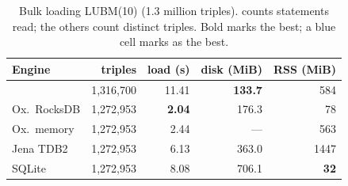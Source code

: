 \begin{table}[t]
\caption{Bulk loading LUBM(10) (1.3 million triples). \sys{} counts statements read; the others count distinct triples. Bold marks the best; a blue cell marks \sys{} as the best.}
\label{tab-load}
\small
\begin{tabular}{@{}lrrrr@{}}
\toprule
Engine & triples & load (s) & disk (MiB) & RSS (MiB) \\
\midrule
\sys{} & 1,316,700 & 11.41 & \cellcolor{ours}\textbf{133.7} & 584 \\
Ox.\ RocksDB & 1,272,953 & \textbf{2.04} & 176.3 & 78 \\
Ox.\ memory & 1,272,953 & 2.44 & --- & 563 \\
Jena TDB2 & 1,272,953 & 6.13 & 363.0 & 1447 \\
SQLite & 1,272,953 & 8.08 & 706.1 & \textbf{32} \\
\bottomrule
\end{tabular}
\end{table}

